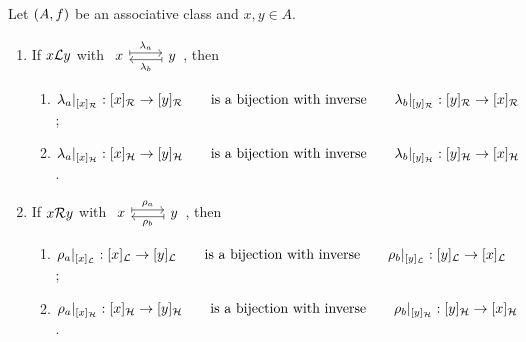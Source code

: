 \begin{proposition} \label{GreensLemma}
Let $\left( A, f \right)$ be an associative class and $x, y\in A$.
\begin{enumerate}
\item If $x\mathcal{L} y$ with $\begin{tikzcd}
x \ar[r, maps to, shift left, "\lambda_a"] & y \ar[l, maps to, shift left, "\lambda_b"]
\end{tikzcd}$, then
\begin{enumerate}
\item $\lambda_a|_{[x]_{\mathcal{R}}}: [x]_{\mathcal{R}} \to [y]_{\mathcal{R}} \qquad \text{is a bijection with inverse} \qquad \lambda_b|_{[y]_{\mathcal{R}}}: [y]_{\mathcal{R}} \to [x]_{\mathcal{R}}$;
\item $\lambda_a|_{[x]_{\mathcal{H}}}: [x]_{\mathcal{H}} \to [y]_{\mathcal{H}} \qquad \text{is a bijection with inverse} \qquad \lambda_b|_{[y]_{\mathcal{H}}}: [y]_{\mathcal{H}} \to [x]_{\mathcal{H}}$.
\end{enumerate}
\item If $x\mathcal{R} y$ with $\begin{tikzcd}
x \ar[r, maps to, shift left, "\rho_a"] & y \ar[l, maps to, shift left, "\rho_b"]
\end{tikzcd}$, then
\begin{enumerate}
\item $\rho_a|_{[x]_{\mathcal{L}}}: [x]_{\mathcal{L}} \to [y]_{\mathcal{L}} \qquad \text{is a bijection with inverse} \qquad \rho_b|_{[y]_{\mathcal{L}}}: [y]_{\mathcal{L}} \to [x]_{\mathcal{L}}$;
\item $\rho_a|_{[x]_{\mathcal{H}}}: [x]_{\mathcal{H}} \to [y]_{\mathcal{H}} \qquad \text{is a bijection with inverse} \qquad \rho_b|_{[y]_{\mathcal{H}}}: [y]_{\mathcal{H}} \to [x]_{\mathcal{H}}$.
\end{enumerate}
\end{enumerate}
\end{proposition}
